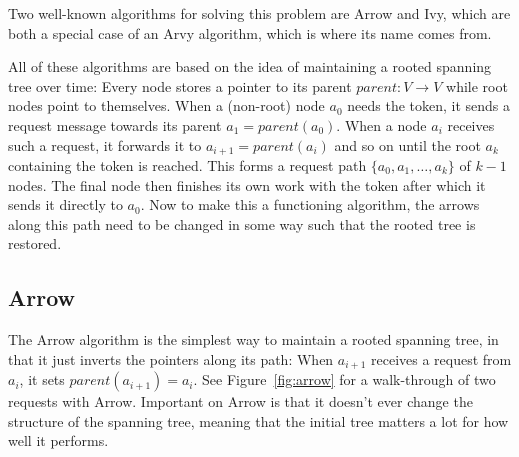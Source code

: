 \documentclass[a4paper, oneside]{discothesis}
\begin{document}
Two well-known algorithms for solving this problem are Arrow and Ivy, which are both a special case of an Arvy algorithm, which is where its name comes from.

All of these algorithms are based on the idea of maintaining a rooted spanning tree over time: Every node stores a pointer to its parent $parent : V \rightarrow V$ while root nodes point to themselves. When a (non-root) node $a_0$ needs the token, it sends a request message towards its parent $a_1=parent(a_0)$. When a node $a_i$ receives such a request, it forwards it to $a_{i+1}=parent(a_i)$ and so on until the root $a_k$ containing the token is reached. This forms a request path $\{a_0,a_1,\dots,a_k\}$ of $k-1$ nodes. The final node then finishes its own work with the token after which it sends it directly to $a_0$. Now to make this a functioning algorithm, the arrows along this path need to be changed in some way such that the rooted tree is restored.

\subsection{Arrow}

The Arrow algorithm is the simplest way to maintain a rooted spanning tree, in that it just inverts the pointers along its path: When $a_{i+1}$ receives a request from $a_i$, it sets $parent(a_{i+1})=a_i$. See Figure~\ref{fig:arrow} for a walk-through of two requests with Arrow. Important on Arrow is that it doesn't ever change the structure of the spanning tree, meaning that the initial tree matters a lot for how well it performs.

\end{document}
